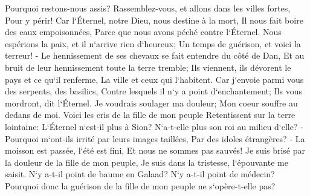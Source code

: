 \verse Pourquoi restons-nous assis? Rassemblez-vous, et allons dans les villes fortes, Pour y périr! Car l`Éternel, notre Dieu, nous destine à la mort, Il nous fait boire des eaux empoisonnées, Parce que nous avons péché contre l`Éternel. 
\verse Nous espérions la paix, et il n`arrive rien d`heureux; Un temps de guérison, et voici la terreur! - 
\verse Le hennissement de ses chevaux se fait entendre du côté de Dan, Et au bruit de leur hennissement toute la terre tremble; Ils viennent, ils dévorent le pays et ce qu`il renferme, La ville et ceux qui l`habitent. 
\verse Car j`envoie parmi vous des serpents, des basilics, Contre lesquels il n`y a point d`enchantement; Ils vous mordront, dit l`Éternel. 
\verse Je voudrais soulager ma douleur; Mon coeur souffre au dedans de moi. 
\verse Voici les cris de la fille de mon peuple Retentissent sur la terre lointaine: L`Éternel n`est-il plus à Sion? N`a-t-elle plus son roi au milieu d`elle? -Pourquoi m`ont-ils irrité par leurs images taillées, Par des idoles étrangères? - 
\verse La moisson est passée, l`été est fini, Et nous ne sommes pas sauvés! 
\verse Je suis brisé par la douleur de la fille de mon peuple, Je suis dans la tristesse, l`épouvante me saisit. 
\verse N`y a-t-il point de baume en Galaad? N`y a-t-il point de médecin? Pourquoi donc la guérison de la fille de mon peuple ne s`opère-t-elle pas? 

\chapter{}


